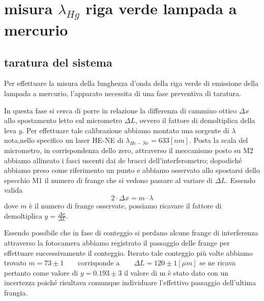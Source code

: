 \section{misura $\lambda_{Hg}$ riga verde lampada a mercurio}
\subsection{taratura del sistema}
Per effettuare la misura della lunghezza d'onda 
della riga verde di emissione della lampada
a mercurio, l'apparato necessita di una fase 
preventiva di taratura.

In questa fase si cerca di porre in relazione la differenza 
di cammino ottico $\Delta x$ allo spostamento letto 
sul micrometro $\Delta L$,
ovvero il fattore di demoltiplica della leva $y$.
Per effettuare tale calibrazione abbiamo 
montato una sorgente di  $\lambda$ nota,nello specifico un laser
HE-NE di $\lambda_{He-Ne}=633 [nm]$.
Posta la scala del micrometro, in corrispondenza dello zero,
attraverso il meccanismo posto su M2 abbiamo allineato i fasci 
uscenti dai de bracci dell'interferometro;
dopodiché abbiamo preso 
come riferimento un punto e abbiamo osservato allo spostarsi dello 
specchio M1 il numero di frange che si vedono 
passare al variare di $\Delta L$.
Essendo valida \smallskip
\begin{equation}\label{eq:lambda}
2 \cdot \Delta x = m \cdot \lambda
 \end{equation}
 \smallskip
dove $m$ è il numero di frange osservate, possiamo ricavare 
il fattore di demoltiplica $y=\frac{\Delta x}{\Delta L}$.

Essendo possibile che in fase di conteggio si perdano 
alcune frange di interferenza attraverso la fotocamera 
abbiamo registrato il passaggio delle frange per effettuare 
successivamente il conteggio.
Iterato tale conteggio più volte abbiamo trovato \smallskip
$m=73 \pm 1 \qquad \text{corrisponde a}\qquad \Delta L =120\pm 1 [\mu m]$
\smallskip
se ne ricava pertanto come valore di $y= 0.193	\pm	3	$ il valore di m è
stato dato con un incertezza poiché risultava comunque individuare l'effettivo 
passaggio dell'ultima frangia.
